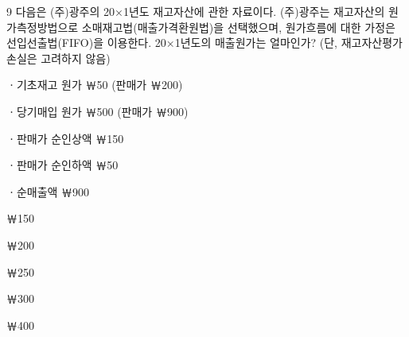 \begin{question}{9}
다음은 (주)광주의 20×1년도 재고자산에 관한 자료이다. (주)광주는 재고자산의 원가측정방법으로 소매재고법(매출가격환원법)을 선택했으며, 원가흐름에 대한 가정은 선입선출법(FIFO)을 이용한다. 20×1년도의 매출원가는 얼마인가? (단, 재고자산평가손실은 고려하지 않음)
\begin{framedtext}
ㆍ기초재고 원가 ￦50 (판매가 ￦200) \par
ㆍ당기매입 원가 ￦500 (판매가 ￦900) \par
ㆍ판매가 순인상액 ￦150 \par
ㆍ판매가 순인하액 ￦50 \par
ㆍ순매출액 ￦900 \par
\end{framedtext}
\begin{choices}
  \item ￦150
  \item ￦200
  \item ￦250
  \item ￦300
  \item ￦400
\end{choices}
\end{question}
